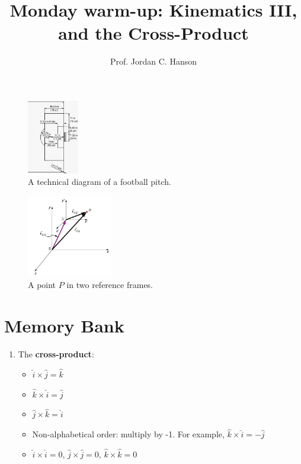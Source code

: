 \documentclass{article}
\begin{document}
\twocolumn

\title{Monday warm-up: Kinematics III, and the Cross-Product}
\author{Prof. Jordan C. Hanson}

\maketitle

\begin{figure}
\centering
\includegraphics[width=0.2\textwidth]{figures/soccer_pitch.png}
\caption{\label{fig:1} A technical diagram of a football pitch.}
\end{figure}

\begin{figure}
\centering
\includegraphics[width=0.33\textwidth]{figures/ref.png}
\caption{\label{fig:2} A point $P$ in two reference frames.}
\end{figure}

\section{Memory Bank}

\begin{enumerate}
\item The \textbf{cross-product}:
\begin{itemize}
\item $\hat{i} \times \hat{j} = \hat{k}$
\item $\hat{k} \times \hat{i} = \hat{j}$
\item $\hat{j} \times \hat{k} = \hat{i}$
\item Non-alphabetical order: multiply by -1. For example, $\hat{k} \times \hat{i} = -\hat{j}$
\item $\hat{i} \times \hat{i} = 0$, $\hat{j} \times \hat{j} = 0$, $\hat{k} \times \hat{k} = 0$
\end{itemize}
\end{enumerate}
\end{document}
